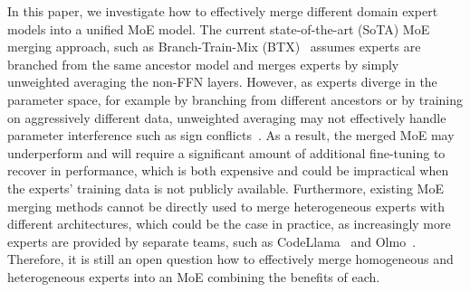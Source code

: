 In this paper, we investigate how to effectively merge different domain expert models into a unified MoE model.
The current state-of-the-art (SoTA) MoE merging approach, such as Branch-Train-Mix (BTX)~\citep{sukhbaatar2024branchtrainmixmixingexpertllms} assumes experts are branched from the same ancestor model and merges experts by simply unweighted averaging the non-FFN layers. 
However, as experts diverge in the parameter space, for example by branching from different ancestors or by training on aggressively different data, unweighted averaging may not effectively handle parameter interference such as sign conflicts~\cite{yu2024language, yadav2024ties}. As a result, the merged MoE may underperform and will require a significant amount of additional fine-tuning to recover in performance, which is both expensive and could be impractical when the experts' training data is not publicly available.
Furthermore, existing MoE merging methods cannot be directly used to merge heterogeneous experts with different architectures, which could be the case in practice, as increasingly more experts are provided by separate teams, such as CodeLlama~\cite{roziere2023code} and Olmo~\cite{groeneveld2024olmo}.
Therefore, it is still an open question how to effectively merge homogeneous and heterogeneous experts into an MoE combining the benefits of each. 


